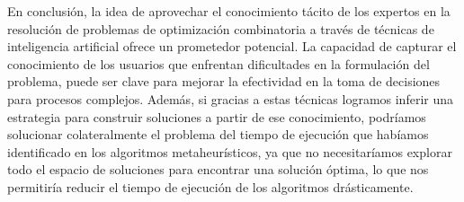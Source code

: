 En conclusión, la idea de aprovechar el conocimiento tácito de los expertos en
la resolución de problemas de optimización combinatoria a través de técnicas de
inteligencia artificial ofrece un prometedor potencial. La capacidad de
capturar el conocimiento de los usuarios que enfrentan dificultades en la
formulación del problema, puede ser clave para mejorar la efectividad en la
toma de decisiones para procesos complejos. Además, si gracias a estas técnicas
logramos inferir una estrategia para construir soluciones a partir de ese
conocimiento, podríamos solucionar colateralmente el problema del tiempo de
ejecución que habíamos identificado en los algoritmos metaheurísticos, ya que
no necesitaríamos explorar todo el espacio de soluciones para encontrar una
solución óptima, lo que nos permitiría reducir el tiempo de ejecución de los
algoritmos drásticamente.

\pagebreak